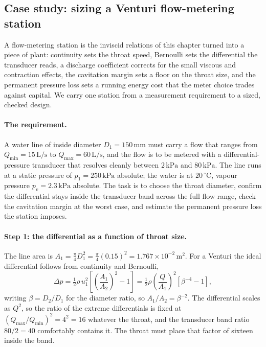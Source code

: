 \subsection{Case study: sizing a Venturi flow-metering station}

A flow-metering station is the inviscid relations of this chapter
turned into a piece of plant: continuity sets the throat speed,
Bernoulli sets the differential the transducer reads, a discharge
coefficient corrects for the small viscous and contraction effects,
the cavitation margin sets a floor on the throat size, and the
permanent pressure loss sets a running energy cost that the meter
choice trades against capital. We carry one station from a measurement
requirement to a sized, checked design.



\paragraph{The requirement.} A water line of inside diameter $D_1 =
150\,\si{\milli\meter}$ must carry a flow that ranges from $Q_\text{min}
= 15\,\text{L/s}$ to $Q_\text{max} = 60\,\text{L/s}$, and the flow is
to be metered with a differential-pressure transducer that resolves
cleanly between $2\,\text{kPa}$ and $80\,\text{kPa}$. The line runs at
a static pressure of $p_1 = 250\,\text{kPa}$ absolute; the water is at
$20\,^{\circ}\mathrm{C}$, vapour pressure $p_v = 2.3\,\text{kPa}$
absolute. The task is to choose the throat diameter, confirm the
differential stays inside the transducer band across the full flow
range, check the cavitation margin at the worst case, and estimate the
permanent pressure loss the station imposes.

\paragraph{Step 1: the differential as a function of throat size.} The
line area is $A_1 = \tfrac{\pi}{4}D_1^2 = \tfrac{\pi}{4}(0.15)^2 =
1.767\times 10^{-2}\,\si{\meter}^2$. For a Venturi the ideal
differential follows from continuity and Bernoulli,
\[
\Delta p = \tfrac12\rho\,u_1^2\!\left[\left(\frac{A_1}{A_2}\right)^2
- 1\right]
= \tfrac12\rho\!\left(\frac{Q}{A_1}\right)^2\!
\left[\beta^{-4} - 1\right],
\]
writing $\beta = D_2/D_1$ for the diameter ratio, so $A_1/A_2 =
\beta^{-2}$. The differential scales as $Q^2$, so the ratio of the
extreme differentials is fixed at $(Q_\text{max}/Q_\text{min})^2 =
4^2 = 16$ whatever the throat, and the transducer band ratio
$80/2 = 40$ comfortably contains it. The throat must place that factor
of sixteen inside the band.

